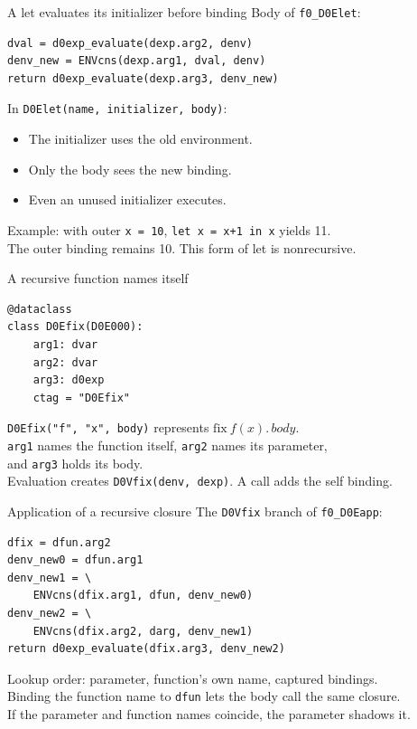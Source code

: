 \documentclass[aspectratio=169,11pt]{beamer}
\begin{document}
\begin{frame}[fragile]{A let evaluates its initializer before binding}
Body of \texttt{f0\_D0Elet}:
\begin{lstlisting}
dval = d0exp_evaluate(dexp.arg2, denv)
denv_new = ENVcns(dexp.arg1, dval, denv)
return d0exp_evaluate(dexp.arg3, denv_new)
\end{lstlisting}
\bigskip
In \texttt{D0Elet(name, initializer, body)}:
\begin{itemize}
\item The initializer uses the old environment.
\item Only the body sees the new binding.
\item Even an unused initializer executes.
\end{itemize}
\medskip
Example: with outer \texttt{x = 10}, \texttt{let x = x+1 in x} yields 11.\\
The outer binding remains 10. This form of let is nonrecursive.
\end{frame}

\begin{frame}[fragile]{A recursive function names itself}
\begin{lstlisting}
@dataclass
class D0Efix(D0E000):
    arg1: dvar
    arg2: dvar
    arg3: d0exp
    ctag = "D0Efix"
\end{lstlisting}
\bigskip
\texttt{D0Efix("f", "x", body)} represents $\mathrm{fix}\ f(x).\,body$.\\[0.7em]
\texttt{arg1} names the function itself, \texttt{arg2} names its parameter,\\
and \texttt{arg3} holds its body.\\[0.7em]
Evaluation creates \texttt{D0Vfix(denv, dexp)}. A call adds the self binding.
\end{frame}

\begin{frame}[fragile]{Application of a recursive closure}
The \texttt{D0Vfix} branch of \texttt{f0\_D0Eapp}:
\begin{lstlisting}
dfix = dfun.arg2
denv_new0 = dfun.arg1
denv_new1 = \
    ENVcns(dfix.arg1, dfun, denv_new0)
denv_new2 = \
    ENVcns(dfix.arg2, darg, denv_new1)
return d0exp_evaluate(dfix.arg3, denv_new2)
\end{lstlisting}
\medskip
Lookup order: parameter, function's own name, captured bindings.\\[0.6em]
Binding the function name to \texttt{dfun} lets the body call the same closure.\\[0.6em]
If the parameter and function names coincide, the parameter shadows it.
\end{frame}
\end{document}
